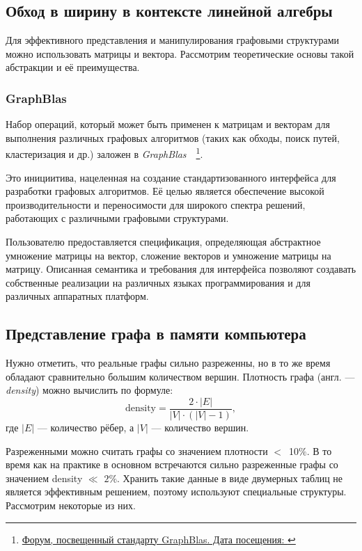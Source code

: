 \subsection{Обход в ширину в контексте линейной алгебры}
\noindent Для эффективного представления и манипулирования графовыми структурами можно использовать матрицы и вектора. Рассмотрим теоретические основы такой абстракции и её преимущества.



\subsubsection*{GraphBlas}
\noindent Набор операций, который может быть применен к матрицам и векторам для выполнения различных графовых алгоритмов (таких как обходы, поиск путей, кластеризация и др.) заложен в \textit{GraphBlas}~\cite{gb_math}~\footnote{\href{https://graphblas.org/}{Форум, посвещенный стандарту GraphBlas. Дата посещения: }}.

Это инициитива, нацеленная на создание стандартизованного интерфейса для разработки графовых алгоритмов. Её целью является обеспечение высокой производительности и переносимости для широкого спектра решений, работающих с различными графовыми структурами.

Пользователю предоставляется спецификация, определяющая абстрактное умножение матрицы на вектор, сложение векторов и умножение матрицы на матрицу. Описанная семантика и требования для интерфейса позволяют создавать собственные реализации на различных языках программирования и для различных аппаратных платформ. 



\subsection{Представление графа в памяти компьютера}
\noindent Нужно отметить, что реальные графы сильно разреженны, но в то же время обладают сравнительно большим количеством вершин.
Плотность графа (англ. --- \textit{density}) можно вычислить по формуле: 
\begin{equation}
\label{eq:density}
	\text{density} = \frac{2 \cdot \big| E \big| }{\big| V \big| \cdot (\big| V \big| - 1)},
\end{equation}
где $\big| E \big|$ --- {количество рёбер}, а $\big| V \big|$ --- количество вершин.

Разреженными можно считать графы со значением плотности $<$~10$\%$. В то время как на практике в основном встречаются сильно разреженные графы со значением density $\ll$ $2\%$. Хранить такие данные в виде двумерных таблиц не является эффективным решением, поэтому используют специальные структуры. Рассмотрим некоторые из них.

